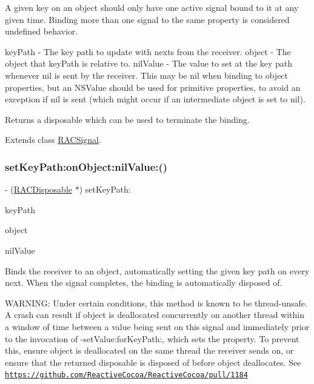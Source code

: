 A given key on an object should only have one active signal bound to it at any given time. Binding more than one signal to the same property is considered undefined behavior.

key\+Path -\/ The key path to update with {\ttfamily next}s from the receiver. object -\/ The object that {\ttfamily key\+Path} is relative to. nil\+Value -\/ The value to set at the key path whenever {\ttfamily nil} is sent by the receiver. This may be nil when binding to object properties, but an N\+S\+Value should be used for primitive properties, to avoid an exception if {\ttfamily nil} is sent (which might occur if an intermediate object is set to {\ttfamily nil}).

Returns a disposable which can be used to terminate the binding. 

Extends class \mbox{\hyperlink{interface_r_a_c_signal_a3d59cca19be3e985aa5a08cb0386faeb}{R\+A\+C\+Signal}}.

\mbox{\label{category_r_a_c_signal_07_operations_08_a3d59cca19be3e985aa5a08cb0386faeb}} 
\subsubsection{\texorpdfstring{set\+Key\+Path\+:on\+Object\+:nil\+Value\+:()}{setKeyPath:onObject:nilValue:()}\hspace{0.1cm}{\footnotesize\ttfamily [3/3]}}
{\footnotesize\ttfamily -\/ (\mbox{\hyperlink{interface_r_a_c_disposable}{R\+A\+C\+Disposable}} $\ast$) set\+Key\+Path\+: \begin{DoxyParamCaption}\item[{(N\+S\+String $\ast$)}]{key\+Path }\item[{onObject:(N\+S\+Object $\ast$)}]{object }\item[{nilValue:(id)}]{nil\+Value }\end{DoxyParamCaption}}

Binds the receiver to an object, automatically setting the given key path on every {\ttfamily next}. When the signal completes, the binding is automatically disposed of.

W\+A\+R\+N\+I\+NG\+: Under certain conditions, this method is known to be thread-\/unsafe. A crash can result if {\ttfamily object} is deallocated concurrently on another thread within a window of time between a value being sent on this signal and immediately prior to the invocation of -\/set\+Value\+:for\+Key\+Path\+:, which sets the property. To prevent this, ensure {\ttfamily object} is deallocated on the same thread the receiver sends on, or ensure that the returned disposable is disposed of before {\ttfamily object} deallocates. See \href{https://github.com/ReactiveCocoa/ReactiveCocoa/pull/1184}{\tt https\+://github.\+com/\+Reactive\+Cocoa/\+Reactive\+Cocoa/pull/1184}

